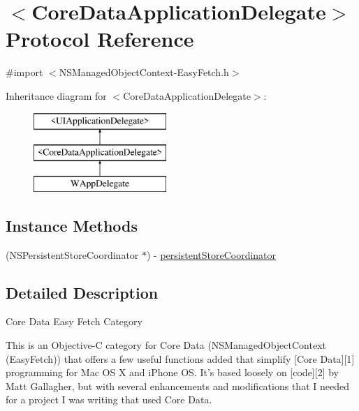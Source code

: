 \hypertarget{protocol_core_data_application_delegate-p}{\section{$<$Core\-Data\-Application\-Delegate$>$ Protocol Reference}
\label{protocol_core_data_application_delegate-p}
}


{\ttfamily \#import $<$N\-S\-Managed\-Object\-Context-\/\-Easy\-Fetch.\-h$>$}

Inheritance diagram for $<$Core\-Data\-Application\-Delegate$>$\-:\begin{figure}[H]
\begin{center}
\leavevmode
\includegraphics[height=3.000000cm]{protocol_core_data_application_delegate-p}
\end{center}
\end{figure}
\subsection*{Instance Methods}
\begin{DoxyCompactItemize}
\item 
(N\-S\-Persistent\-Store\-Coordinator $\ast$) -\/ \hyperlink{protocol_core_data_application_delegate-p_a493a7f1a00497bb2ee69a60aed922774}{persistent\-Store\-Coordinator}
\end{DoxyCompactItemize}


\subsection{Detailed Description}
Core Data Easy Fetch Category

This is an Objective-\/\-C category for Core Data ({\ttfamily N\-S\-Managed\-Object\-Context (Easy\-Fetch)}) that offers a few useful functions added that simplify \mbox{[}Core Data\mbox{]}\mbox{[}1\mbox{]} programming for Mac O\-S X and i\-Phone O\-S. It's based loosely on \mbox{[}code\mbox{]}\mbox{[}2\mbox{]} by Matt Gallagher, but with several enhancements and modifications that I needed for a project I was writing that used Core Data.

